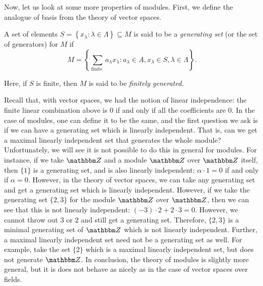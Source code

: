 Now, let us look at some more properties of modules. First, we define the analogue of basis from the theory of vector spaces.
\begin{definition}
    A set of elements $S=\left\{x_{\lambda} : \lambda \in \Lambda \right\} \subseteq M$ is said to be a {\it generating set} (or the set of generators) for $M$ if
    \[M=\left\{\sum_{\text{finite }} a_{\lambda} x_{\lambda}: a_{\lambda} \in A, x_{\lambda} \in S, \lambda \in \Lambda\right\}.\]

    Here, if $S$ is finite, then $M$ is said to be {\it finitely generated}. 
\end{definition}
Recall that, with vector spaces, we had the notion of linear independence: the finite linear combination above is $0$ if and only if all the coefficients are $0$. In the case of modules, one can define it to be the same, and the first question we ask is if we can have a generating set which is linearly independent. That is, can we get a maximal linearly independent set that generates the whole module? Unfortunately, we will see it is not possible to do this in general for modules. For instance, if we take ${\Z}$ and a module ${\Z}$ over ${\Z}$ itself, then $\{1\}$ is a generating set, and is also linearly independent: $\alpha \cdot 1=0$ if and only if $\alpha=0$. However, in the theory of vector spaces, we can take any generating set and get a generating set which is linearly independent. However, if we take the generating set $\{2,3\}$ for the module $\Z$ over $\Z$, then we can see that this is not linearly independent: $(-3) \cdot 2+2 \cdot 3=0$. However, we cannot throw out $3$ or $2$ and still get a generating set. Therefore, $\{2,3\}$ is a minimal generating set of $\Z$ which is not linearly independent. Further, a maximal linearly independent set need not be a generating set as well. For example, take the set $\{2\}$ which is a maximal linearly independent set, but does not generate $\Z$. In conclusion, the theory of modules is slightly more general, but it is does not behave as nicely as in the case of vector spaces over fields.

